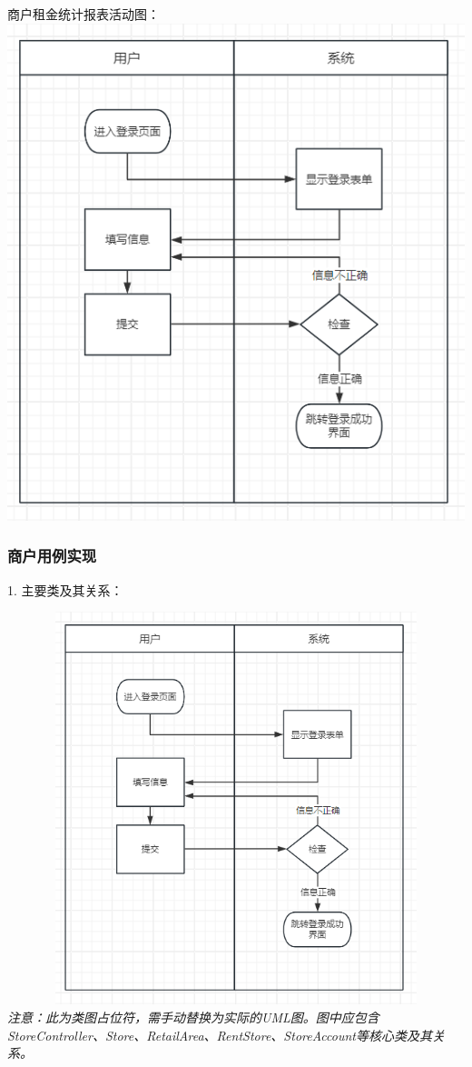 \documentclass[]{article}
\begin{document}
商户租金统计报表活动图：
\includegraphics{media/media/image1.png}

\hypertarget{ux5546ux6237ux7528ux4f8bux5b9eux73b0}{%
\subsubsection{商户用例实现}\label{ux5546ux6237ux7528ux4f8bux5b9eux73b0}}

1. 主要类及其关系：

\includegraphics[width=6.2in,height=4.5in]{media/media/image1.png} %
\textit{注意：此为类图占位符，需手动替换为实际的UML图。图中应包含StoreController、Store、RetailArea、RentStore、StoreAccount等核心类及其关系。}
\end{document}
